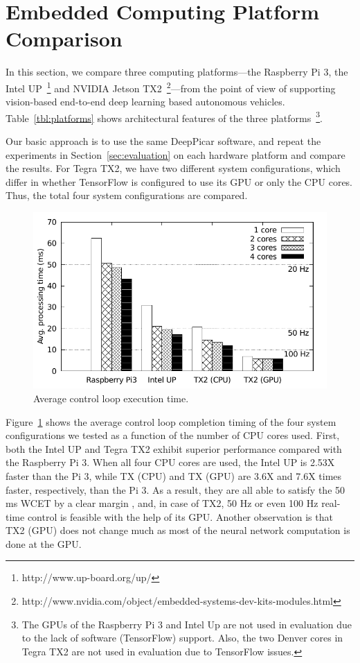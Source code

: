 
%

\section{Embedded Computing Platform Comparison}\label{sec:comparison}

In this section, we compare three computing platforms---the Raspberry
Pi 3, the Intel UP~\footnote{http://www.up-board.org/up/} and NVIDIA
Jetson
TX2~\footnote{http://www.nvidia.com/object/embedded-systems-dev-kits-modules.html}---from
the point of view of supporting vision-based end-to-end deep learning
based autonomous vehicles. 
Table~\ref{tbl:platforms} shows architectural features of the three
platforms~\footnote{The GPUs of the Raspberry Pi 3 and Intel
  Up are not used in evaluation due to the lack of software (TensorFlow)
support. Also, the two Denver cores in Tegra TX2 are not used in
evaluation due to TensorFlow issues.}.
  
Our basic approach is to use the same DeepPicar software, and repeat
the experiments in Section~\ref{sec:evaluation} on each hardware
platform and compare the results. 
For Tegra TX2, we have two different system configurations,
which differ in whether TensorFlow is configured to use its GPU or
only the CPU cores. Thus, the total four system configurations are
compared.

\begin{figure}[h]
  \centering
  \includegraphics[width=.45\textwidth]{figs/compare_core}
  \caption{Average control loop execution time.} 
  \label{fig:sys_core}
\end{figure}

Figure~\ref{fig:sys_core} shows the average control loop completion
timing of the four system configurations we tested as a function of
the number of CPU cores used.
First, both the Intel UP and Tegra TX2 exhibit superior performance
compared with the Raspberry Pi 3. 
When all four CPU cores are used, the Intel UP is 2.53X faster than
the Pi 3, while TX (CPU) and TX (GPU) are 3.6X and 7.6X times faster,
respectively, than the Pi 3. 
As a result, they are all able to satisfy the 50 ms 
WCET by a clear margin
, and, in case of TX2, 50 Hz or even 100 Hz real-time control is
feasible with the help of its GPU. Another observation is that TX2
(GPU) does not change much as most of the neural network computation
is done at the GPU.

